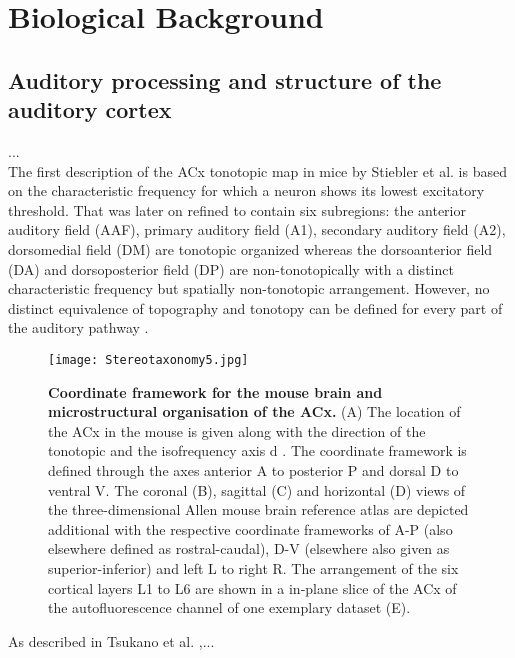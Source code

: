 \documentclass[12pt,oneside,ngerman,reqno,a4paper]{article}
\numberwithin{equation}{section}
\begin{document}
\newpage
\section{Biological Background}
\subsection{Auditory processing and structure of the auditory cortex}
...\\
The first description of the ACx tonotopic map in mice by  Stiebler et al. \cite{Stiebler1997} is based on the characteristic frequency for which a neuron shows its lowest excitatory threshold. That was later on refined to contain six subregions: the anterior auditory field (AAF), primary auditory field (A1), secondary
auditory field (A2), dorsomedial field (DM) are tonotopic organized whereas the dorsoanterior field (DA) and dorsoposterior field (DP) are non-tonotopically with a distinct characteristic frequency but spatially non-tonotopic arrangement. However, no distinct equivalence of topography and tonotopy can be defined for every part of the auditory pathway \cite{Tsukano2017}.\\ %
\begin{figure}[H]
	\begin{center}
		\texttt{[image: Stereotaxonomy5.jpg]}
		\caption[Stereotaxonomy]{\textbf{Coordinate framework for the mouse brain and microstructural organisation of the ACx.} (A) The location of the ACx in the mouse is given along with the direction of the tonotopic and the isofrequency axis d \cite{Oviedo2010}. The coordinate framework is defined through the axes anterior A to posterior P and dorsal D to ventral V. The coronal (B), sagittal (C) and horizontal (D) views of the three-dimensional Allen mouse brain reference atlas \cite{Wang2020} are depicted additional with the respective coordinate frameworks of A-P (also elsewhere defined as rostral-caudal), D-V (elsewhere also given as superior-inferior) and left L to right R. The arrangement of the six cortical layers L1 to L6 are shown in a in-plane slice of the ACx of the autofluorescence channel of one exemplary dataset (E).
			\label{stereotaxonomy}}
	\end{center}
\end{figure}
\vspace{-0.75cm}
As described in Tsukano et al. \cite{Tsukano2017},...
\end{document}
